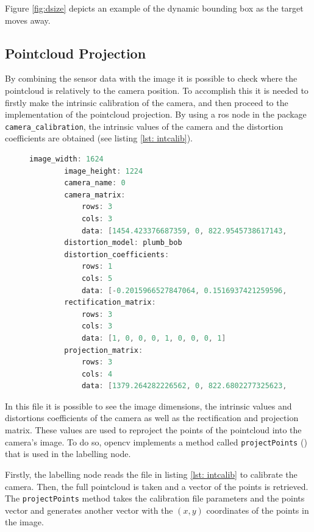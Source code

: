 Figure \ref{fig:dsize} depicts an example of the dynamic bounding box as the target moves away.

\subsection{Pointcloud Projection}

By combining the sensor data with the image it is possible to check where the pointcloud is relatively to the camera position. To accomplish this it is needed to firstly make the intrinsic calibration of the camera, and then proceed to the implementation of the pointcloud projection. By using a \gls{ros} node in the package \texttt{camera\_calibration}, the intrinsic values of the camera and the distortion coefficients are obtained (see listing \ref{lst: intcalib}).

\begin{figure}
	\begin{center}
		\begin{lstlisting}[caption={Intrinsic Calibration Result}, language=c++, label={lst: intcalib}]
		image_width: 1624
		image_height: 1224
		camera_name: 0
		camera_matrix:
			rows: 3
			cols: 3
			data: [1454.423376687359, 0, 822.9545738617143, 0, 1458.005828758985, 590.5652711935882, 0, 0, 1]
		distortion_model: plumb_bob
		distortion_coefficients:
			rows: 1
			cols: 5
			data: [-0.2015966527847064, 0.1516937421259596, -0.0009340794635090795, -0.0006787308984611241, 0]
		rectification_matrix:
			rows: 3
			cols: 3
			data: [1, 0, 0, 0, 1, 0, 0, 0, 1]
		projection_matrix:
			rows: 3
			cols: 4
			data: [1379.264282226562, 0, 822.6802277325623, 0, 0, 1410.231689453125, 588.4764252277164, 0, 0, 0, 1, 0]\end{lstlisting}
	\end{center}
\end{figure}

In this file it is possible to see the image dimensions, the intrinsic values and distortions coefficients of the camera as well as the rectification and projection matrix. These values are used to reproject the points of the pointcloud into the camera's image. To do so, \gls{opencv} implements a method called \texttt{projectPoints} (\cite{OpenCVa}) that is used in the labelling node. 

Firstly, the labelling node reads the file in listing \ref{lst: intcalib} to calibrate the camera. Then, the full pointcloud is taken and a vector of the points is retrieved. The \texttt{projectPoints} method takes the calibration file parameters and the points vector and generates another vector with the $(x,y)$ coordinates of the points in the image.

